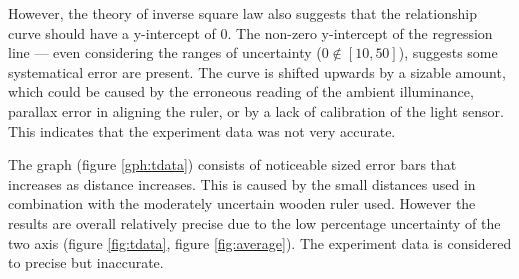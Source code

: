 \documentclass[a4paper,12pt]{article}
\begin{document}
However, the theory of inverse square law also suggests that the relationship curve should have a y-intercept of 0. The non-zero y-intercept of the regression line --- even considering the ranges of uncertainty ($0 \notin [10, 50]$), suggests some systematical error are present. The curve is shifted upwards by a sizable amount, which could be caused by the erroneous reading of the ambient illuminance, parallax error in aligning the ruler, or by a lack of calibration of the light sensor. This indicates that the experiment data was not very accurate.

The graph (figure \ref{gph:tdata}) consists of noticeable sized error bars that increases as distance increases. This is caused by the small distances used in combination with the moderately uncertain wooden ruler used. However the results are overall relatively precise due to the low percentage uncertainty of the two axis (figure \ref{fig:tdata}, figure \ref{fig:average}). The experiment data is considered to precise but inaccurate.


\end{document}
